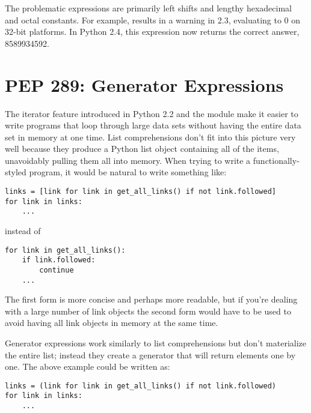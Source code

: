 \documentclass{howto}
\begin{document}
The problematic expressions are primarily left shifts and lengthy
hexadecimal and octal constants.  For example,
 results
in a warning in 2.3, evaluating to 0 on 32-bit platforms.  In Python
2.4, this expression now returns the correct answer, 8589934592.

\begin{seealso}
\end{seealso}

\section{PEP 289: Generator Expressions}

The iterator feature introduced in Python 2.2 and the
 module make it easier to write programs that loop
through large data sets without having the entire data set in memory
at one time.  List comprehensions don't fit into this picture very
well because they produce a Python list object containing all of the
items, unavoidably pulling them all into memory.  When trying to write
a functionally-styled program, it would be natural to write something
like:

\begin{verbatim}
links = [link for link in get_all_links() if not link.followed]
for link in links:
    ...
\end{verbatim}

instead of 

\begin{verbatim}
for link in get_all_links():
    if link.followed:
        continue
    ...
\end{verbatim}

The first form is more concise and perhaps more readable, but if
you're dealing with a large number of link objects the second form
would have to be used to avoid having all link objects in memory at
the same time.

Generator expressions work similarly to list comprehensions but don't
materialize the entire list; instead they create a generator that will
return elements one by one.  The above example could be written as:

\begin{verbatim}
links = (link for link in get_all_links() if not link.followed)
for link in links:
    ...
\end{verbatim}
\end{document}
